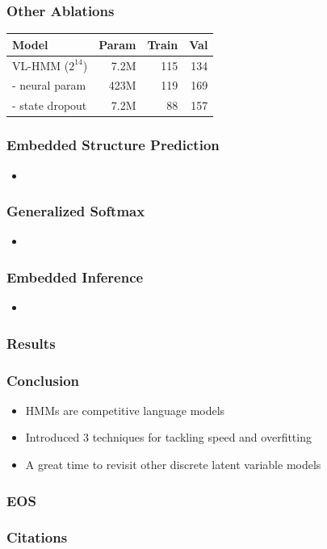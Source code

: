 \documentclass{beamer}
\begin{document}
\begin{frame}
\frametitle{Other Ablations}

\begin{center}
\begin{tabular}{lrrr}
\toprule
Model                 & Param & Train & Val\\
\midrule
VL-HMM ($2^{14}$)     & 7.2M & 115    & 134 \\
\quad - neural param  & 423M & 119    & 169 \\
\quad - state dropout & 7.2M & 88     & 157 \\
\bottomrule
\end{tabular}
\end{center}
\end{frame}

\begin{frame}
\frametitle{Embedded Structure Prediction}
\begin{itemize}
\item 
\end{itemize}
\end{frame}

\begin{frame}
\frametitle{Generalized Softmax}
\begin{itemize}
\item 
\end{itemize}
\end{frame}

\begin{frame}
\frametitle{Embedded Inference}
\begin{itemize}
\item 
\end{itemize}
\end{frame}

\begin{frame}
    \frametitle{Results}
\end{frame}

\begin{frame}
\frametitle{Conclusion}
\begin{itemize}
\item HMMs are competitive language models
\vspace{2em}
\item Introduced 3 techniques for tackling speed and overfitting
\vspace{2em}
\item A great time to revisit other discrete latent variable models
\end{itemize}
\end{frame}

\begin{frame}
\frametitle{EOS}
\end{frame}


\begin{frame}
\frametitle{Citations}


\end{frame}
\end{document}
